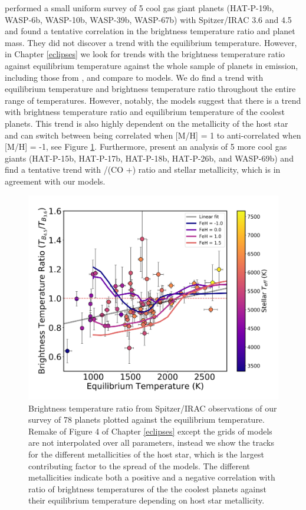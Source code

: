 \citet{Kammer2015} performed a small uniform survey of 5 cool gas giant planets (HAT-P-19b, WASP-6b, WASP-10b, WASP-39b, WASP-67b) with Spitzer/IRAC 3.6 and 4.5~\um~ and found a tentative correlation in the brightness temperature ratio and planet mass. They did not discover a trend with the equilibrium temperature. However, in Chapter \ref{eclipses} we look for trends with the brightness temperature ratio against equilibrium temperature against the whole sample of planets in emission, including those from \citet{Kammer2015}, and compare to models.
We do find a trend with equilibrium temperature and brightness temperature ratio throughout the entire range of temperatures. However, notably, the models suggest that there is a trend with brightness temperature ratio and equilibrium temperature of the coolest planets. This trend is also highly dependent on the metallicity of the host star and can switch between being correlated when [M/H] = 1 to anti-correlated when [M/H] = -1, see Figure \ref{int:fig:Tbratio}. Furthermore, \citet{Wallack2019} present an analysis of 5 more cool gas giants (HAT-P-15b, HAT-P-17b, HAT-P-18b, HAT-P-26b, and WASP-69b) and find a tentative trend with /(CO +) ratio and stellar metallicity, which is in agreement with our models.

\begin{figure}
    \centering
    \includegraphics[width = \linewidth]{TbratiovsTeq_PHOENIX_intpl_wlabels.pdf}
    \caption{Brightness temperature ratio from Spitzer/IRAC observations of our survey of 78 planets plotted against the equilibrium temperature. Remake of Figure 4 of Chapter \ref{eclipses} except the grids of models are not interpolated over all parameters, instead we show the tracks for the different metallicities of the host star, which is the largest contributing factor to the spread of the models. The different metallicities indicate both a positive and a negative correlation with ratio of brightness temperatures of the the coolest planets against their equilibrium temperature depending on host star metallicity. }
    \label{int:fig:Tbratio}
\end{figure}


